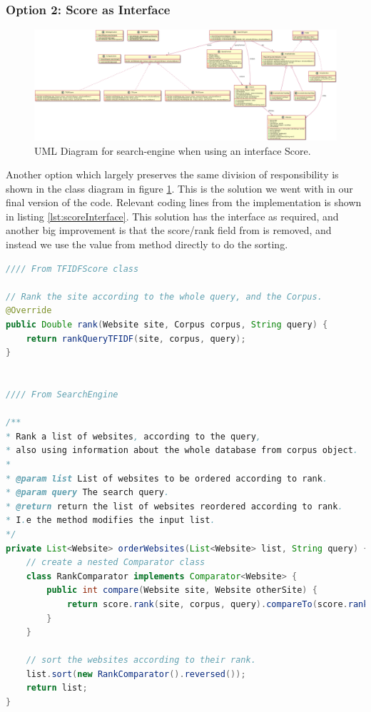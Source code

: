 \subsubsection{Option 2: Score as Interface}
\begin{figure}
	\centering
	\includegraphics[width=\textwidth]{graphics/uml/ScoreAsInterface.png}
	\caption{UML Diagram for search-engine when using an interface Score.}
	\label{fig:uml:ScoreAsInterface}
\end{figure}
Another option which largely preserves the same division of responsibility is shown in the class diagram in figure \ref{fig:uml:ScoreAsInterface}. This is the solution we went with in our final version of the code. Relevant coding lines from the implementation is shown in listing \ref{lst:scoreInterface}.
This solution has the  interface as required, and another big improvement is that the score/rank field from  is removed, and instead we use the value from  method directly to do the sorting.  


\begin{lstlisting}[language={Java}, caption={This is a code example.}, label={lst:scoreInterface}]
//// From TFIDFScore class 

// Rank the site according to the whole query, and the Corpus.
@Override
public Double rank(Website site, Corpus corpus, String query) {
	return rankQueryTFIDF(site, corpus, query);
}


//// From SearchEngine 

/**
* Rank a list of websites, according to the query, 
* also using information about the whole database from corpus object. 
*
* @param list List of websites to be ordered according to rank.
* @param query The search query.
* @return return the list of websites reordered according to rank.
* I.e the method modifies the input list.  
*/
private List<Website> orderWebsites(List<Website> list, String query) {
	// create a nested Comparator class
	class RankComparator implements Comparator<Website> {
		public int compare(Website site, Website otherSite) {
			return score.rank(site, corpus, query).compareTo(score.rank(otherSite, corpus, query));
		}
	}

	// sort the websites according to their rank.
	list.sort(new RankComparator().reversed());     
	return list;
}
\end{lstlisting}



